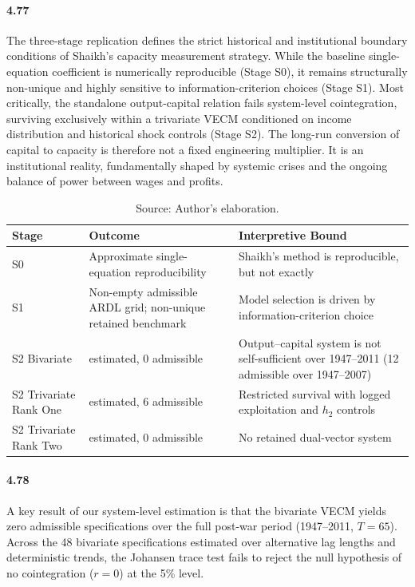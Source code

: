 \paragraph{4.77}
The three-stage replication defines the strict historical and institutional boundary conditions of Shaikh’s capacity measurement strategy. While the baseline single-equation coefficient is numerically reproducible (Stage S0), it remains structurally non-unique and highly sensitive to information-criterion choices (Stage S1). Most critically, the standalone output-capital relation fails system-level cointegration, surviving exclusively within a trivariate VECM conditioned on income distribution and historical shock controls (Stage S2). The long-run conversion of capital to capacity is therefore not a fixed engineering multiplier. It is an institutional reality, fundamentally shaped by systemic crises and the ongoing balance of power between wages and profits.

\begin{table}[H]
\centering
\caption{Cross-Stage Synthesis of the Cointegration Architecture}
\label{tab:cross_stage_synthesis}
\small
\begin{tabular}{@{}>{\raggedright\arraybackslash}p{3.2cm}>{\raggedright\arraybackslash}p{4.6cm}>{\raggedright\arraybackslash}p{5.6cm}@{}}
\toprule
Stage & Outcome & Interpretive Bound \\
\midrule
\midrule
S0 & Approximate single-equation reproducibility & Shaikh's method is reproducible, but not exactly \\
S1 & Non-empty admissible ARDL grid; non-unique retained benchmark & Model selection is driven by information-criterion choice \\
S2 Bivariate & 48 estimated, 0 admissible & Output--capital system is not self-sufficient over 1947--2011 (12 admissible over 1947--2007) \\
S2 Trivariate Rank One & 48 estimated, 6 admissible & Restricted survival with logged exploitation and $h_2$ controls \\
S2 Trivariate Rank Two & 48 estimated, 0 admissible & No retained dual-vector system \\
\bottomrule
\end{tabular}
\caption*{\footnotesize Source: Author's elaboration.}
\end{table}

\paragraph{4.78}
A key result of our system-level estimation is that the bivariate VECM yields zero admissible specifications over the full post-war period (1947--2011, $T=65$). Across the 48 bivariate specifications estimated over alternative lag lengths and deterministic trends, the Johansen trace test fails to reject the null hypothesis of no cointegration ($r=0$) at the 5\% level.

